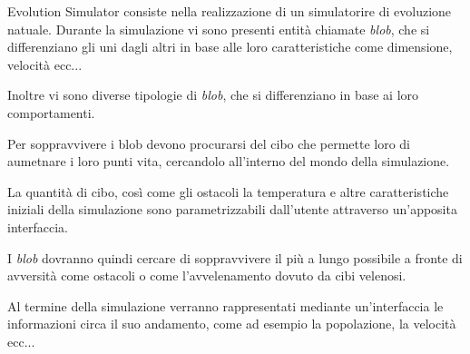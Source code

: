 
Evolution Simulator consiste nella realizzazione di un simulatorire di evoluzione natuale. Durante la simulazione vi sono presenti entità chiamate \textit{blob}, che si differenziano gli uni dagli altri in base alle loro caratteristiche come dimensione, velocità ecc... 

Inoltre vi sono diverse tipologie di \textit{blob}, che si differenziano in base ai loro comportamenti. 

Per soppravvivere i blob devono procurarsi del cibo che permette loro di aumetnare i loro punti vita, cercandolo all'interno del mondo della simulazione.

La quantità di cibo, così come gli ostacoli la temperatura e altre caratteristiche iniziali della simulazione sono parametrizzabili dall'utente attraverso un'apposita interfaccia.

I \textit{blob} dovranno quindi cercare di soppravvivere il più a lungo possibile a fronte di avversità come ostacoli o come l'avvelenamento dovuto da cibi velenosi.

Al termine della simulazione verranno rappresentati mediante un'interfaccia le informazioni circa il suo andamento, come ad esempio la popolazione, la velocità ecc...